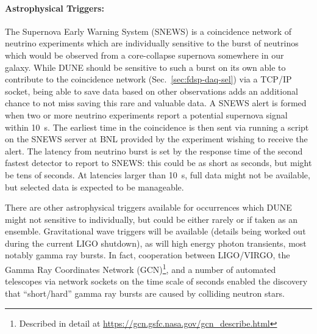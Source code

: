 \paragraph{Astrophysical Triggers:} The Supernova Early Warning System
(SNEWS) is a coincidence network of neutrino experiments which are
individually sensitive to the burst of neutrinos which would be observed
from a core-collapse supernova somewhere in our galaxy.  While DUNE
should be sensitive to such a burst on its own able to contribute to the
coincidence network (Sec.~\ref{sec:fdsp-daq-sel}) via a TCP/IP socket,
being able to save data based on other observations adds an additional
chance to not miss saving this rare and valuable data.  A SNEWS alert is
formed when two or more neutrino experiments report a potential
supernova signal within \SI{10}{\s}.  The earliest time in the
coincidence is then sent via running a script on the SNEWS server at BNL
provided by the experiment wishing to receive the alert.  The latency
from neutrino burst is set by the response time of the second fastest
detector to report to SNEWS: this could be as short as seconds, but
might be tens of seconds.  At latencies larger than \SI{10}{\s}, full
data might not be available, but selected data is expected to be manageable.

There are other astrophysical triggers available for occurrences which
DUNE might not sensitive to individually, but could be either rarely or
if taken as an ensemble.  Gravitational wave triggers will be available
(details being worked out during the current LIGO shutdown), as will
high energy photon transients, most notably gamma ray bursts.  In fact,
cooperation between LIGO/VIRGO, the Gamma Ray Coordinates Network
(GCN)\footnote{Described in detail at
  \url{https://gcn.gsfc.nasa.gov/gcn_describe.html}}, and a number of
automated telescopes via network sockets on the time scale of seconds
enabled the discovery that ``short/hard'' gamma ray bursts are caused by
colliding neutron stars\cite{kilonova}.

